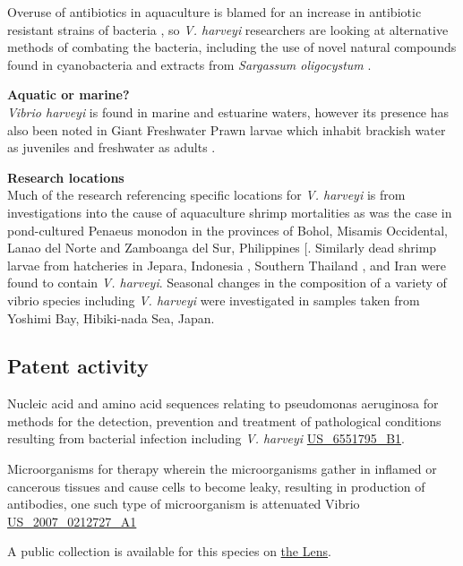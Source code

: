 \documentclass[]{book}
\theoremstyle{definition}
\theoremstyle{definition}
\theoremstyle{definition}
\theoremstyle{remark}
\begin{document}
Overuse of antibiotics in aquaculture is blamed for an increase in
antibiotic resistant strains of bacteria \citep{Elmahdi_2016}, so
\emph{V. harveyi} researchers are looking at alternative methods of
combating the bacteria, including the use of novel natural compounds
found in cyanobacteria \citep{Maneechote_2016} and extracts from
\emph{Sargassum oligocystum} \citep{Baleta_2011}.

\textbf{Aquatic or marine?}\\
\emph{Vibrio harveyi} is found in marine and estuarine waters, however
its presence has also been noted in Giant Freshwater Prawn larvae which
inhabit brackish water as juveniles and freshwater as adults
\citep{Pande_2013}.

\textbf{Research locations}\\
Much of the research referencing specific locations for \emph{V.
harveyi} is from investigations into the cause of aquaculture shrimp
mortalities as was the case in pond-cultured Penaeus monodon in the
provinces of Bohol, Misamis Occidental, Lanao del Norte and Zamboanga
del Sur, Philippines {[}\citet{Pena_2003}. Similarly dead shrimp larvae
from hatcheries in Jepara, Indonesia \citep{Prayitno_1995}, Southern
Thailand \citep{Ruangpan_1999}, and Iran \citep{Afsharnasab_2014} were
found to contain \emph{V. harveyi}. Seasonal changes in the composition
of a variety of vibrio species including \emph{V. harveyi} were
investigated in samples taken from Yoshimi Bay, Hibiki-nada Sea, Japan.

\hypertarget{patent-activity-8}{%
\subsection{Patent activity}\label{patent-activity-8}}

Nucleic acid and amino acid sequences relating to pseudomonas aeruginosa
for methods for the detection, prevention and treatment of pathological
conditions resulting from bacterial infection including \emph{V.
harveyi}
\href{https://www.lens.org/lens/patent/US_6551795_B1}{US\_6551795\_B1}.

Microorganisms for therapy wherein the microorganisms gather in inflamed
or cancerous tissues and cause cells to become leaky, resulting in
production of antibodies, one such type of microorganism is attenuated
Vibrio
\href{https://www.lens.org/lens/patent/US_2007_0212727_A1}{US\_2007\_0212727\_A1}

A public collection is available for this species on
\href{https://www.lens.org/lens/collection/24872}{the Lens}.
\end{document}
